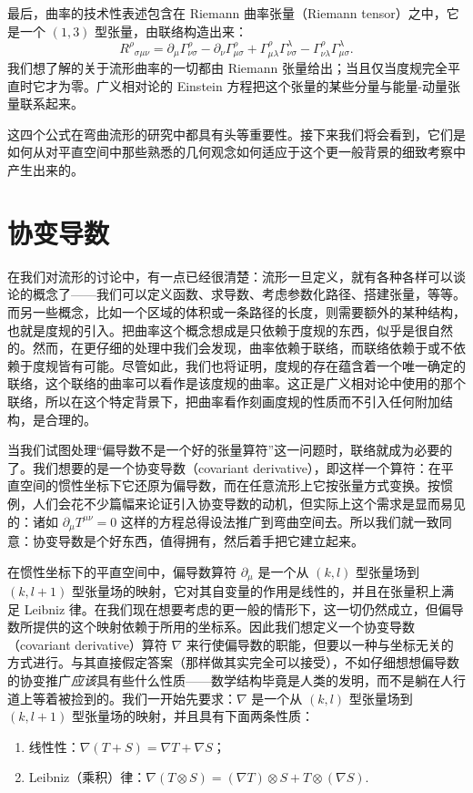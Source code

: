 最后，曲率的技术性表述包含在 Riemann 曲率张量（Riemann tensor）之中，它是一个 $(1,3)$ 型张量，由联络构造出来：
\begin{equation*}
R^\rho{}_{\sigma\mu\nu} = \partial_\mu \Gamma^\rho_{\nu\sigma} - \partial_\nu \Gamma^\rho_{\mu\sigma} + \Gamma^\rho_{\mu\lambda}\Gamma^\lambda_{\nu\sigma} - \Gamma^\rho_{\nu\lambda}\Gamma^\lambda_{\mu\sigma}.
\tag{3.4}
\end{equation*}
我们想了解的关于流形曲率的一切都由 Riemann 张量给出；当且仅当度规完全平直时它才为零。广义相对论的 Einstein 方程把这个张量的某些分量与能量-动量张量联系起来。

这四个公式在弯曲流形的研究中都具有头等重要性。接下来我们将会看到，它们是如何从对平直空间中那些熟悉的几何观念如何适应于这个更一般背景的细致考察中产生出来的。

\section{协变导数}

在我们对流形的讨论中，有一点已经很清楚：流形一旦定义，就有各种各样可以谈论的概念了——我们可以定义函数、求导数、考虑参数化路径、搭建张量，等等。而另一些概念，比如一个区域的体积或一条路径的长度，则需要额外的某种结构，也就是度规的引入。把曲率这个概念想成是只依赖于度规的东西，似乎是很自然的。然而，在更仔细的处理中我们会发现，曲率依赖于联络，而联络依赖于或不依赖于度规皆有可能。尽管如此，我们也将证明，度规的存在蕴含着一个唯一确定的联络，这个联络的曲率可以看作是该度规的曲率。这正是广义相对论中使用的那个联络，所以在这个特定背景下，把曲率看作刻画度规的性质而不引入任何附加结构，是合理的。

当我们试图处理“偏导数不是一个好的张量算符”这一问题时，联络就成为必要的了。我们想要的是一个协变导数（covariant derivative），即这样一个算符：在平直空间的惯性坐标下它还原为偏导数，而在任意流形上它按张量方式变换。按惯例，人们会花不少篇幅来论证引入协变导数的动机，但实际上这个需求是显而易见的：诸如 $\partial_\mu T^{\mu\nu} = 0$ 这样的方程总得设法推广到弯曲空间去。所以我们就一致同意：协变导数是个好东西，值得拥有，然后着手把它建立起来。

在惯性坐标下的平直空间中，偏导数算符 $\partial_\mu$ 是一个从 $(k,l)$ 型张量场到 $(k,l+1)$ 型张量场的映射，它对其自变量的作用是线性的，并且在张量积上满足 Leibniz 律。在我们现在想要考虑的更一般的情形下，这一切仍然成立，但偏导数所提供的这个映射依赖于所用的坐标系。因此我们想定义一个协变导数（covariant derivative）算符 $\nabla$ 来行使偏导数的职能，但要以一种与坐标无关的方式进行。与其直接假定答案（那样做其实完全可以接受），不如仔细想想偏导数的协变推广\emph{应该}具有些什么性质——数学结构毕竟是人类的发明，而不是躺在人行道上等着被捡到的。我们一开始先要求：$\nabla$ 是一个从 $(k,l)$ 型张量场到 $(k,l+1)$ 型张量场的映射，并且具有下面两条性质：
\begin{enumerate}
\item 线性性：$\nabla(T + S) = \nabla T + \nabla S$；
\item Leibniz（乘积）律：$\nabla(T \otimes S) = (\nabla T)\otimes S + T\otimes(\nabla S)$.
\end{enumerate}


